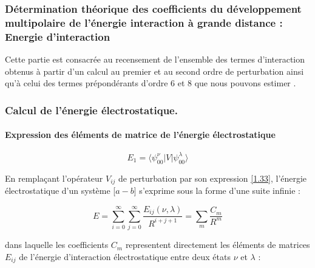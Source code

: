 	
	
	\subsubsection{Détermination théorique des coefficients du développement multipolaire de l’énergie interaction à grande distance : Energie d’interaction}
	
	
	Cette partie est consacrée au recensement de l'ensemble des termes d'interaction obtenus à partir d'un calcul au premier et au second ordre de perturbation ainsi qu'à celui des termes prépondérants d'ordre 6 et 8 que nous pouvons estimer \cite{saute1982calculated}.
	
	\subsubsection{Calcul de l’énergie électrostatique.}
	
	\paragraph{Expression des éléments de matrice de l'énergie électrostatique}
	
	\begin{equation}
	E_{1} = \langle \psi_{00}^{\nu}|V| \psi_{00}^{\lambda}\rangle
	\end{equation}
	
	
	En remplaçant l'opérateur $V_{ij}$ de perturbation par son expression \ref{1.33}, l'énergie électrostatique d'un système [$a-b$] s'exprime sous la forme d'une suite infinie : 
	
	\begin{equation}
	E = \sum_{i=0}^{\infty} \sum_{j=0}^{\infty} \frac{E_{ij} (\nu,\lambda)}{R^{i+j+1}} = \sum_{m} \frac{C_{m}}{R^{m}}
	\end{equation}
	
	dans laquelle les coefficients $C_{m}$ representent directement les éléments de matrices $E_{ij}$ de l'énergie d'interaction électrostatique entre deux états $\nu$ et $\lambda$ : 
	
